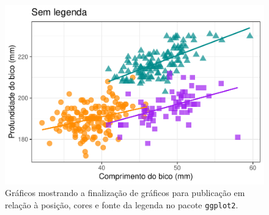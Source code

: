 \documentclass[
]{article}
\begin{document}
\begin{figure}
\centering
\includegraphics{epr_files/figure-latex/fig-plot-final-legenda-3.pdf}
\caption{\label{fig:fig-plot-final-legenda-3}Gráficos mostrando a finalização de gráficos para publicação em relação à posição, cores e fonte da legenda no pacote \texttt{ggplot2}.}
\end{figure}
\end{document}
